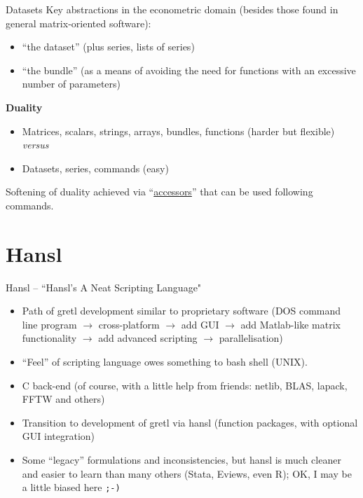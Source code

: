 \documentclass{beamer}[11pt]
\begin{document}
\begin{frame}{Datasets}
	  Key abstractions in the econometric domain (besides those found in
	  general matrix-oriented software):
	  \begin{itemize}
	  	\item ``the dataset'' (plus series, lists of series)
	  	\item ``the bundle'' (as a means of avoiding the need for functions
	  	with an excessive number of parameters)
	  \end{itemize}
	  
	  
	  \textbf{Duality}
	  \begin{itemize}
	  	\item Matrices, scalars, strings, arrays, bundles, functions (harder but flexible) \emph{versus}
	  	\item Datasets, series, commands (easy)
	  \end{itemize}
	  
	  \vspace{0.5cm}
	  
	  Softening of duality achieved via ``\underline{accessors}'' that can be used following commands. %
	
\end{frame}

\section{Hansl}

\begin{frame}{Hansl -- “Hansl’s A Neat Scripting Language"}
	
	\begin{itemize}
		\item Path of gretl development similar to proprietary software (DOS
		command line program $\to$ cross-platform $\to$ add GUI $\to$ add
		Matlab-like matrix functionality $\to$ add advanced scripting $ \to $ parallelisation) %
		\item ``Feel'' of scripting language owes something to bash shell (UNIX).
		\item C back-end (of course, with a little help from friends:
		netlib, BLAS, lapack, FFTW and others) %
		\item Transition to development of gretl via hansl (function
		packages, with optional GUI integration) %
		\item Some ``legacy'' formulations and inconsistencies, but hansl is much cleaner and easier to learn than many others (Stata, Eviews,	even R); OK, I may be a little biased here \texttt{;-)}
	\end{itemize}
\end{frame}
\end{document}
